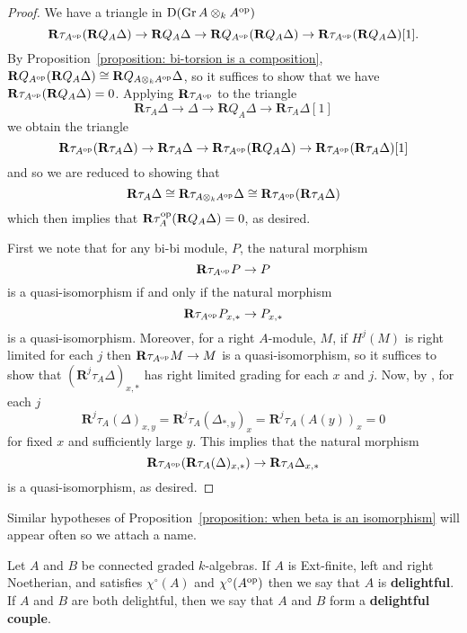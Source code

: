 \begin{proof}
  We have a triangle in \(\mathrm{D}(\operatorname{Gr}A \otimes_k A^{\operatorname{op}})\)
  \[\mathbf{R}\tau_{A^{\operatorname{op}}} (\mathbf{R}Q_A \Delta) \to \mathbf{R}Q_A \Delta \to \mathbf{R}Q_{A^{\operatorname{op}}} (\mathbf{R}Q_A \Delta) \to \mathbf{R}\tau_{A^{\operatorname{op}}} (\mathbf{R}Q_A \Delta)[1].\]
  By Proposition~\ref{proposition: bi-torsion is a composition}, \(\mathbf{R}Q_{A^{\operatorname{op}}}(\mathbf{R}Q_A \Delta) \cong \mathbf{R}Q_{A \otimes_k A^{\operatorname{op}}} \Delta\), so it suffices to show that we have \(\mathbf{R}\tau_{A^{\operatorname{op}}}(\mathbf{R}Q_A \Delta) = 0\).
  Applying \(\mathbf{R}\tau_{A^{\operatorname{op}}}\) to the triangle
  \[\mathbf{R}\tau_A \Delta \to \Delta \to \mathbf{R}Q_A \Delta \to \mathbf{R}\tau_A \Delta[1]\]
  we obtain the triangle
  \[\mathbf{R}\tau_{A^{\operatorname{op}}} (\mathbf{R}\tau_A \Delta) \to \mathbf{R}\tau_A \Delta \to \mathbf{R}\tau_{A^{\operatorname{op}}} (\mathbf{R}Q_A \Delta) \to \mathbf{R}\tau_{A^{\operatorname{op}}} (\mathbf{R}\tau_A \Delta)[1]\]
  and so we are reduced to showing that
  \[\mathbf{R}\tau_A \Delta \cong \mathbf{R}\tau_{A \otimes_k A^{\operatorname{op}}}\Delta \cong \mathbf{R}\tau_{A^{\operatorname{op}}} (\mathbf{R}\tau_A \Delta)\]
  which then implies that \(\mathbf{R}\tau_A^{\operatorname{op}}(\mathbf{R}Q_A \Delta) = 0\), as desired.

  First we note that for any bi-bi module, \(P\), the natural morphism
  \[\mathbf{R}\tau_{A^{\operatorname{op}}} P \to P\]
  is a quasi-isomorphism if and only if the natural morphism
  \[\mathbf{R}\tau_{A^{\operatorname{op}}} P_{x,\ast} \to P_{x,\ast}\]
  is a quasi-isomorphism.
  Moreover, for a right \(A\)-module, \(M\), if \(H^j(M)\) is right limited for each \(j\) then \(\mathbf{R} \tau_{A^{\operatorname{op}}} M \to M\) is a quasi-isomorphism,
  so it suffices to show that \((\mathbf{R}^j \tau_A \Delta)_{x,\ast}\) has right limited grading for each \(x\) and \(j\).
  Now, by \parencite[Cor. 3.6 (3)]{AZ94}, for each \(j\)
  \[\mathbf{R}^j\tau_A(\Delta)_{x,y} = \mathbf{R}^j\tau_A(\Delta_{\ast,y})_x = \mathbf{R}^j\tau_A(A(y))_x = 0\]
  for fixed \(x\) and sufficiently large \(y\).
  This implies that the natural morphism
  \[\mathbf{R}\tau_{A^{\operatorname{op}}}(\mathbf{R}\tau_A(\Delta)_{x,\ast}) \to \mathbf{R}\tau_A\Delta_{x,\ast}\]
  is a quasi-isomorphism, as desired.
\end{proof}

Similar hypotheses of Proposition~\ref{proposition: when beta is an isomorphism} will appear often so we attach a name. 

\begin{definition} \label{definition: delightful couple}
  Let \(A\) and \(B\) be connected graded \(k\)-algebras. If \(A\) is Ext-finite, left and right Noetherian, and satisfies \(\chi^\circ(A)\) and \(\chi^\circ(A^{\operatorname{op}})\) then we say that \(A\) is \textbf{delightful}. If \(A\) and \(B\) are both delightful, then we say that \(A\) and \(B\) form a \textbf{delightful couple}. 
\end{definition}
